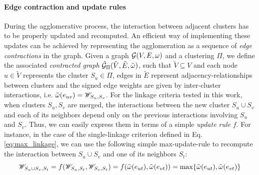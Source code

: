 

\paragraph{Edge contraction and update rules} During the agglomerative process, the interaction between adjacent clusters has to be properly updated and recomputed.  %
An efficient way of implementing these updates can be achieved by representing the agglomeration as a sequence of \emph{edge contractions} in the graph. Given a graph $\mathcal{G}(V,E,\omega)$ and a clustering $\Pi$, we define the associated \emph{contracted graph} $\tilde{\mathcal{G}}_\Pi(\tilde{V}, \tilde{E}, \tilde{\omega})$, such that $\tilde{V} \subseteq V$ and each node $u\in \tilde{V}$ represents the cluster $S_u \in \Pi$, edges in $\tilde{E}$ represent adjacency-relationships between clusters and the signed edge weights are given by inter-cluster interactions, i.e. $\tilde{\omega}(e_{uv})=\mathscr{W}_{S_u,S_v}$. 
For the linkage criteria tested in this work, when clusters $S_u,S_v$ are merged, the interactions between the new cluster $S_u \cup S_v$ and each of its neighbors depend only on the previous interactions involving $S_u$ and $S_v$. Thus, we can easily express them in terms of a simple \emph{update rule} $f$. For instance, in the case of the single-linkage criterion defined in Eq. \ref{eq:max_linkage}, we can use the following simple max-update-rule to recompute the interaction between $S_u \cup S_v$ and one of its neighbors $S_t$:
\begin{equation}
  \mathscr{W}_{S_u \cup S_v,S_t} = f( \mathscr{W}_{S_u,S_t}, \mathscr{W}_{S_v,S_t}) = f(\tilde{\omega}(e_{ut}), \tilde{\omega}(e_{vt})) = \max \{ \tilde{\omega}(e_{ut}), \tilde{\omega}(e_{vt}) \}
\end{equation}


